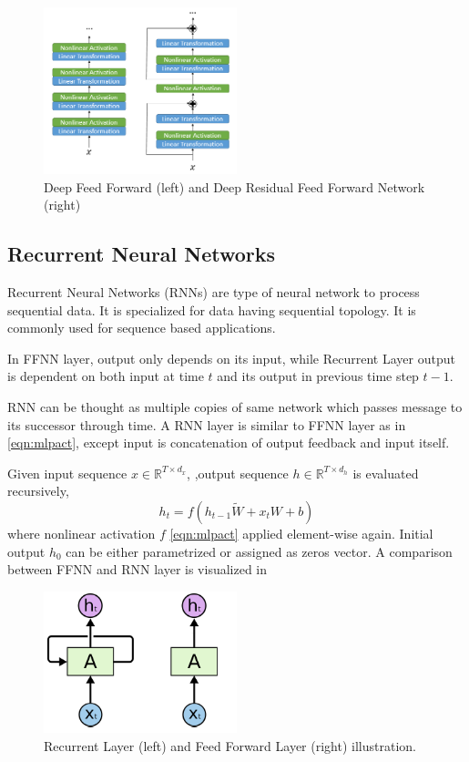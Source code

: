 \begin{figure}
	\centering
	\includegraphics[width=0.5\textwidth]{figures/ml_theory/rffnn_ffnn.png}
	\caption{Deep Feed Forward (left) and Deep Residual Feed Forward Network (right)}
	\label{fig:rffnn_ffnn}
\end{figure}

\subsection{Recurrent Neural Networks}

Recurrent Neural Networks (RNNs) \cite{rumelhart_learning_1986} are type of neural network to process sequential data. 
It is specialized for data having sequential topology. 
It is commonly used for sequence based applications. 

In FFNN layer, output only depends on its input, while Recurrent Layer output is dependent on both input at time $t$ and its output in previous time step $t-1$. 

RNN can be thought as multiple copies of same network which passes message to its successor through time. 
A RNN layer is similar to FFNN layer as in \eqref{eqn:mlpact}, 
except input is concatenation of output feedback and input itself.

Given input sequence $x \in \mathbb{R}^{T \times d_x}$, ,output sequence $h \in \mathbb{R}^{T \times d_h}$ is evaluated recursively,  
\begin{equation}
\label{eqn:rnnact}
h_t = f (h_{t-1} \tilde{W} + x_t W + b)
\end{equation}
where nonlinear activation $f$ \ref{eqn:mlpact} applied element-wise again. Initial output $h_0$ can be either parametrized or assigned as zeros vector. A comparison between FFNN and RNN layer is visualized in 

\begin{figure}
	\centering
	\includegraphics[width=0.5\textwidth]{figures/ml_theory/rnn_vs_ffnn_layer.png}
	\caption{Recurrent Layer (left) and Feed Forward Layer (right) illustration.}
	\label{fig:rnn_vs_ffnn}
\end{figure}

